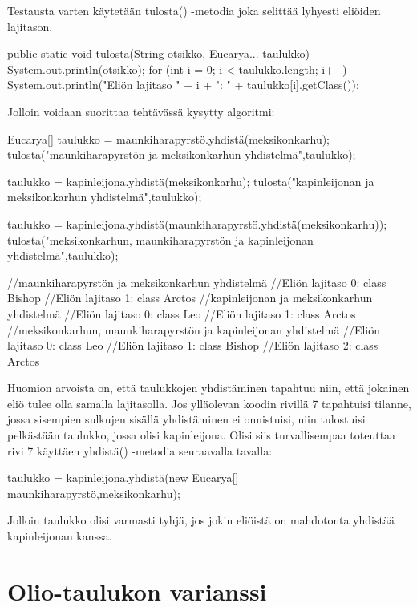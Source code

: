 Testausta varten käytetään tulosta() -metodia joka selittää lyhyesti eliöiden lajitason. 

\begin{javacode}
public static void tulosta(String otsikko, Eucarya... taulukko) {
	System.out.println(otsikko);
	for (int i = 0; i < taulukko.length; i++) {
		System.out.println("Eliön lajitaso " + i + ": " + taulukko[i].getClass());
	}
}
\end{javacode}

Jolloin voidaan suorittaa tehtävässä kysytty algoritmi:

\begin{javacode}
Eucarya[] taulukko = maunkiharapyrstö.yhdistä(meksikonkarhu);
tulosta("maunkiharapyrstön ja meksikonkarhun yhdistelmä",taulukko);

taulukko = kapinleijona.yhdistä(meksikonkarhu);
tulosta("kapinleijonan ja meksikonkarhun yhdistelmä",taulukko);

taulukko = kapinleijona.yhdistä(maunkiharapyrstö.yhdistä(meksikonkarhu));
tulosta("meksikonkarhun, maunkiharapyrstön ja kapinleijonan yhdistelmä",taulukko);

//maunkiharapyrstön ja meksikonkarhun yhdistelmä
//Eliön lajitaso 0: class Bishop
//Eliön lajitaso 1: class Arctos
//kapinleijonan ja meksikonkarhun yhdistelmä
//Eliön lajitaso 0: class Leo
//Eliön lajitaso 1: class Arctos
//meksikonkarhun, maunkiharapyrstön ja kapinleijonan yhdistelmä
//Eliön lajitaso 0: class Leo
//Eliön lajitaso 1: class Bishop
//Eliön lajitaso 2: class Arctos
\end{javacode}

Huomion arvoista on, että taulukkojen yhdistäminen tapahtuu niin, että jokainen
eliö tulee olla samalla lajitasolla. Jos ylläolevan koodin rivillä 7 tapahtuisi
tilanne, jossa sisempien sulkujen sisällä yhdistäminen ei onnistuisi, niin
tulostuisi pelkästään taulukko, jossa olisi kapinleijona. Olisi siis
turvallisempaa toteuttaa rivi 7 käyttäen yhdistä() -metodia seuraavalla tavalla:

\begin{javacode}
taulukko = kapinleijona.yhdistä(new Eucarya[] {maunkiharapyrstö,meksikonkarhu});
\end{javacode}

Jolloin taulukko olisi varmasti tyhjä, jos jokin eliöistä on mahdotonta yhdistää
kapinleijonan kanssa.

\section{Olio-taulukon varianssi}

